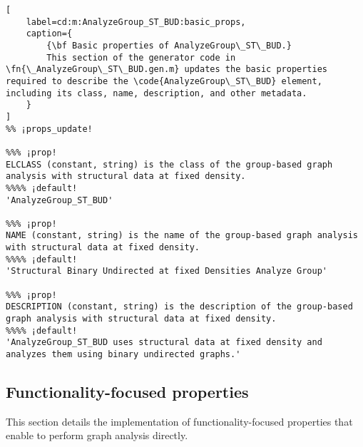 \documentclass{tufte-handout}
\begin{document}
\begin{lstlisting}[
	label=cd:m:AnalyzeGroup_ST_BUD:basic_props,
	caption={
		{\bf Basic properties of AnalyzeGroup\_ST\_BUD.}
		This section of the generator code in \fn{\_AnalyzeGroup\_ST\_BUD.gen.m} updates the basic properties required to describe the \code{AnalyzeGroup\_ST\_BUD} element, including its class, name, description, and other metadata.
	}
]
%% ¡props_update!

%%% ¡prop!
ELCLASS (constant, string) is the class of the group-based graph analysis with structural data at fixed density.
%%%% ¡default!
'AnalyzeGroup_ST_BUD'

%%% ¡prop!
NAME (constant, string) is the name of the group-based graph analysis with structural data at fixed density.
%%%% ¡default!
'Structural Binary Undirected at fixed Densities Analyze Group'

%%% ¡prop!
DESCRIPTION (constant, string) is the description of the group-based graph analysis with structural data at fixed density.
%%%% ¡default!
'AnalyzeGroup_ST_BUD uses structural data at fixed density and analyzes them using binary undirected graphs.'

\end{lstlisting}

\subsection{Functionality-focused properties}

This section details the implementation of functionality-focused properties that enable  to perform graph analysis directly.
\end{document}
